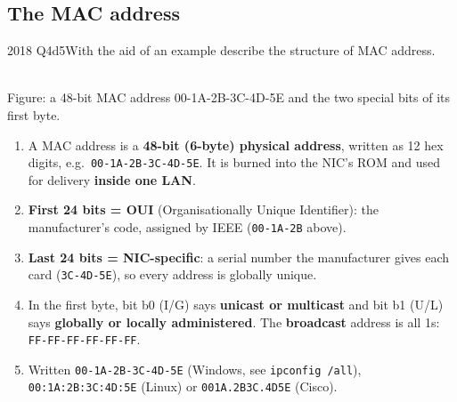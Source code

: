 \documentclass[10pt]{article}
\begin{document}
\subsection{The MAC address}
\begin{pastq}{2018 Q4d}{5}With the aid of an example describe the structure of MAC address.\end{pastq}
\begin{center}
\\
{\scriptsize\color{midgrey}Figure: a 48-bit MAC address 00-1A-2B-3C-4D-5E and the two special bits of its first byte.}
\end{center}
\begin{ans}
\begin{enumerate}
\item A MAC address is a \textbf{48-bit (6-byte) physical address}, written as 12 hex digits, e.g.\ \texttt{00-1A-2B-3C-4D-5E}. It is burned into the NIC's ROM and used for delivery \textbf{inside one LAN}.
\item \textbf{First 24 bits = OUI} (Organisationally Unique Identifier): the manufacturer's code, assigned by IEEE (\texttt{00-1A-2B} above).
\item \textbf{Last 24 bits = NIC-specific}: a serial number the manufacturer gives each card (\texttt{3C-4D-5E}), so every address is globally unique.
\item In the first byte, bit b0 (I/G) says \textbf{unicast or multicast} and bit b1 (U/L) says \textbf{globally or locally administered}. The \textbf{broadcast} address is all 1s: \texttt{FF-FF-FF-FF-FF-FF}.
\item Written \texttt{00-1A-2B-3C-4D-5E} (Windows, see \texttt{ipconfig /all}), \texttt{00:1A:2B:3C:4D:5E} (Linux) or \texttt{001A.2B3C.4D5E} (Cisco).
\end{enumerate}
\end{ans}
\end{document}
